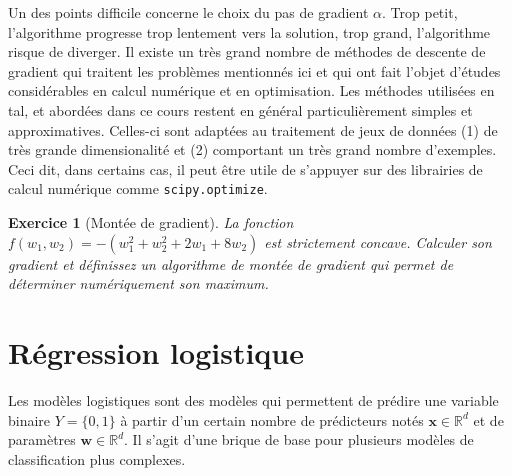 \documentclass[11pt,openany]{book}
\newtheorem{exo}{Exercice}[chapter]
\newcommand{\ac}[1]{{\sc #1}} %
\begin{document}
 
Un des points difficile concerne le choix du pas de gradient $\alpha$.
Trop petit, l'algorithme progresse trop lentement vers la solution,
trop grand, l'algorithme risque de diverger. Il existe un très grand
nombre de méthodes de descente de gradient qui traitent les problèmes
mentionnés ici et qui ont fait l'objet d'études considérables en
calcul numérique et en optimisation. 
Les méthodes utilisées en \ac{tal}, et abordées dans ce cours restent en général particulièrement
simples et approximatives. Celles-ci sont adaptées au traitement de jeux de données (1) de très
grande dimensionalité et (2) comportant un très grand nombre d'exemples.
Ceci dit, dans certains cas, il peut être utile de s'appuyer sur des librairies de
calcul numérique comme {\tt scipy.optimize}.

\begin{exo}[Montée de gradient]
La fonction $f(w_1,w_2)= -(w_1^2+w_2^2+2w_1+8w_2)$ est
strictement concave. Calculer son gradient et définissez un algorithme de montée de gradient
qui permet de déterminer numériquement son maximum.
\end{exo}


\section{Régression logistique}

Les modèles logistiques sont des modèles qui permettent de prédire une
variable binaire $Y =  \{0,1\}$ à partir d'un certain nombre de
prédicteurs notés $\mathbf{x}\in \mathbb{R}^d$ et de paramètres $\mathbf{w}\in \mathbb{R}^d$.
Il s'agit d'une brique de base pour plusieurs modèles de classification plus complexes.
\end{document}
